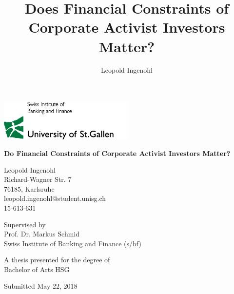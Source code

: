 \documentclass[12pt]{article}
\title{Does Financial Constraints of Corporate Activist Investors Matter?}
\author{Leopold Ingenohl}
\begin{document}
\begin{titlepage}
    \begin{center}
       
        \includegraphics[width=0.5\textwidth]{Logo.jpg}
       
        \vspace*{1.5cm}
		\Large
        \textbf{Do Financial Constraints of Corporate Activist Investors Matter?}

        \vspace{1.5cm}
		\normalsize
        Leopold Ingenohl\\
        Richard-Wagner Str. 7\\
        76185, Karlsruhe\\
        leopold.ingenohl@student.unisg.ch\\
        15-613-631

        \vspace{1.5cm}
        Supervised by\\
        Prof. Dr. Markus Schmid\\
        Swiss Institute of Banking and Finance (s/bf)\\
        \vfill

        A thesis presented for the degree of\\
        Bachelor of Arts HSG

        \vspace{0.8cm}

        Submitted May 22, 2018

	\end{center}
	
\end{titlepage}
\end{document}
